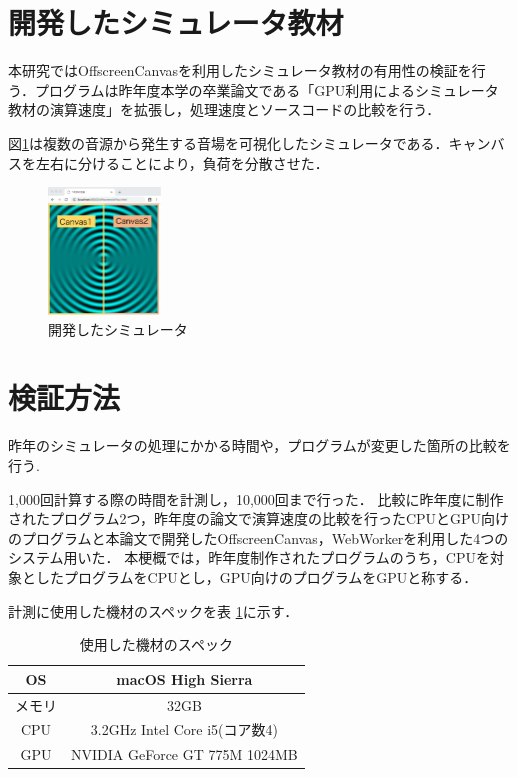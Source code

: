 \documentclass[twocolumn,10pt,a4j]{jsarticle}
\begin{document}
\section{開発したシミュレータ教材}
本研究ではOffscreenCanvasを利用したシミュレータ教材の有用性の検証を行う．プログラムは昨年度本学の卒業論文である「GPU利用によるシミュレータ教材の演算速度」を拡張し，処理速度とソースコードの比較を行う．

図\ref{fig:one}は複数の音源から発生する音場を可視化したシミュレータである．キャンバスを左右に分けることにより，負荷を分散させた．


\begin{figure}[htbp]
  \begin{center}
   \includegraphics[width=30mm]{sim.pdf}
  \end{center}
  \caption{開発したシミュレータ}
  \label{fig:one}
\end{figure}

\section{検証方法}
昨年のシミュレータの処理にかかる時間や，プログラムが変更した箇所の比較を行う.
 
1,000回計算する際の時間を計測し，10,000回まで行った．
比較に昨年度に制作されたプログラム2つ，昨年度の論文で演算速度の比較を行ったCPUとGPU向けのプログラムと本論文で開発したOffscreenCanvas，WebWorkerを利用した4つのシステム用いた．
本梗概では，昨年度制作されたプログラムのうち，CPUを対象としたプログラムをCPUとし，GPU向けのプログラムをGPUと称する．


計測に使用した機材のスペックを表 \ref{tab:tab1}に示す．

\begin{table} [h]
\centering
\caption{使用した機材のスペック}
	\begin{tabular} {| c | c |} \hline
	OS & macOS High Sierra \\ \hline
	メモリ & 32GB \\ \hline
	CPU & 3.2GHz Intel Core i5(コア数4) \\ \hline
	GPU & NVIDIA GeForce GT 775M 1024MB\\ \hline
	\end{tabular} 
	\label{tab:tab1}
\end{table}
\end{document}
